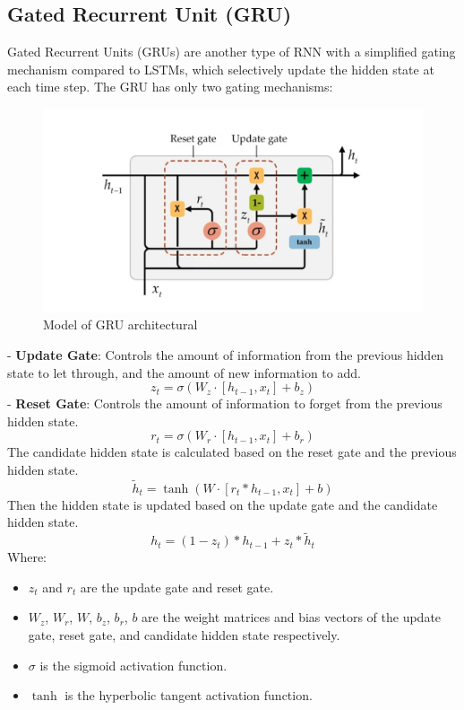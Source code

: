 \documentclass{ieeeojies}
\begin{document}
\subsection{Gated Recurrent Unit (GRU)}
Gated Recurrent Units (GRUs) are another type of RNN with a simplified gating mechanism compared to LSTMs, which selectively update the hidden state at each time step. The GRU has only two gating mechanisms:\\
\begin{figure}[H]
    \centering
    \includegraphics[width=\linewidth]{./image/GRU.png}
    \caption{Model of GRU architectural}
    \label{fig:9}
\end{figure}
- \textbf{Update Gate}: Controls the amount of information from the previous hidden state to let through, and the amount of new information to add.
\begin{dmath*}
    z_t = \sigma(W_z \cdot [h_{t-1}, x_t] + b_z)
\end{dmath*}
- \textbf{Reset Gate}: Controls the amount of information to forget from the previous hidden state.
\begin{dmath*}
    r_t = \sigma(W_r \cdot [h_{t-1}, x_t] + b_r)
\end{dmath*}
The candidate hidden state is calculated based on the reset gate and the previous hidden state.
\begin{dmath*}
    \tilde{h}_t = \tanh(W \cdot [r_t * h_{t-1}, x_t] + b)
\end{dmath*}
Then the hidden state is updated based on the update gate and the candidate hidden state.
\begin{dmath*}
    h_t = (1 - z_t) * h_{t-1} + z_t * \tilde{h}_t
\end{dmath*}
Where:
\begin{itemize}
    \item \(z_t\) and \(r_t\) are the update gate and reset gate.
    \item \(W_z\), \(W_r\), \(W\), \(b_z\), \(b_r\), \(b\) are the weight matrices and bias vectors of the update gate, reset gate, and candidate hidden state respectively.
    \item \(\sigma\) is the sigmoid activation function.
    \item \(\tanh\) is the hyperbolic tangent activation function.
\end{itemize}
\end{document}
